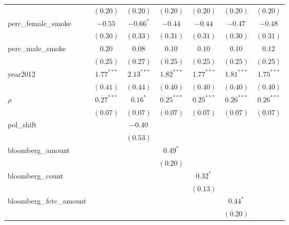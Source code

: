 \begin{table}[!h]
\begin{center}
\begin{tabular}{l c c c c c c }
                        & $(0.20)$     & $(0.20)$     & $(0.20)$     & $(0.20)$     & $(0.20)$     & $(0.20)$     \\
perc\_female\_smoke     & $-0.55$      & $-0.66^{*}$  & $-0.44$      & $-0.44$      & $-0.47$      & $-0.48$      \\
                        & $(0.30)$     & $(0.33)$     & $(0.31)$     & $(0.31)$     & $(0.30)$     & $(0.31)$     \\
perc\_male\_smoke       & $0.20$       & $0.08$       & $0.10$       & $0.10$       & $0.10$       & $0.12$       \\
                        & $(0.25)$     & $(0.27)$     & $(0.25)$     & $(0.25)$     & $(0.25)$     & $(0.25)$     \\
year2012                & $1.77^{***}$ & $2.13^{***}$ & $1.82^{***}$ & $1.77^{***}$ & $1.81^{***}$ & $1.75^{***}$ \\
                        & $(0.41)$     & $(0.44)$     & $(0.40)$     & $(0.40)$     & $(0.40)$     & $(0.40)$     \\
$\rho$                  & $0.27^{***}$ & $0.16^{*}$   & $0.25^{***}$ & $0.25^{***}$ & $0.26^{***}$ & $0.26^{***}$ \\
                        & $(0.07)$     & $(0.07)$     & $(0.07)$     & $(0.07)$     & $(0.07)$     & $(0.07)$     \\
pol\_shift              &              & $-0.40$      &              &              &              &              \\
                        &              & $(0.53)$     &              &              &              &              \\
bloomberg\_amount       &              &              & $0.49^{*}$   &              &              &              \\
                        &              &              & $(0.20)$     &              &              &              \\
bloomberg\_count        &              &              &              & $0.32^{*}$   &              &              \\
                        &              &              &              & $(0.13)$     &              &              \\
bloomberg\_fctc\_amount &              &              &              &              & $0.44^{*}$   &              \\
                        &              &              &              &              & $(0.20)$     &              \\

\end{tabular}
\end{center}
\end{table}
